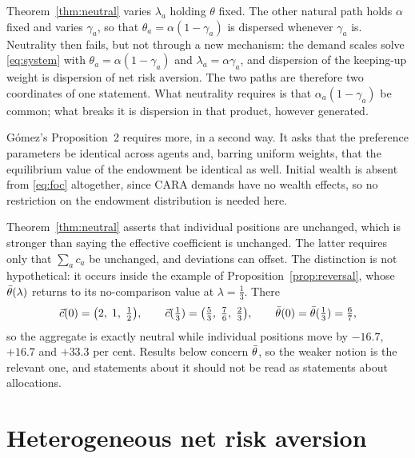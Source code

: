 \begin{remark}
\label{rem:param}
Theorem~\ref{thm:neutral} varies $\lambda_a$ holding $\theta$ fixed. The other
natural path holds $\alpha$ fixed and varies $\gamma_a$, so that
$\theta_a=\alpha(1-\gamma_a)$ is dispersed whenever $\gamma_a$ is. Neutrality
then fails, but not through a new mechanism: the demand scales solve
\eqref{eq:system} with $\theta_a=\alpha(1-\gamma_a)$ and
$\lambda_a=\alpha\gamma_a$, and dispersion of the keeping-up weight is
dispersion of net risk aversion. The two paths are therefore two coordinates of
one statement. What neutrality requires is that $\alpha_a(1-\gamma_a)$ be
common; what breaks it is dispersion in that product, however generated.

Gómez's Proposition~2 requires more, in a second way. It asks that the
preference parameters be identical across agents and, barring uniform weights,
that the equilibrium value of the endowment be identical as well. Initial
wealth is absent from \eqref{eq:foc} altogether, since CARA demands have no
wealth effects, so no restriction on the endowment distribution is needed here.
\end{remark}

\begin{remark}
\label{rem:two}
Theorem~\ref{thm:neutral} asserts that individual positions are unchanged,
which is stronger than saying the effective coefficient is unchanged. The latter
requires only that $\sum_ac_a$ be unchanged, and deviations can offset. The
distinction is not hypothetical: it occurs inside the example of
Proposition~\ref{prop:reversal}, whose $\bar\theta(\lambda)$ returns to its
no-comparison value at $\lambda=\tfrac13$. There
%
\begin{equation*}
\vec c(0)=\big(2,\;1,\;\tfrac12\big),
\qquad
\vec c(\tfrac13)=\big(\tfrac53,\;\tfrac76,\;\tfrac23\big),
\qquad
\bar\theta(0)=\bar\theta(\tfrac13)=\tfrac67 ,
\end{equation*}
%
so the aggregate is exactly neutral while individual positions move by
$-16.7$, $+16.7$ and $+33.3$ per cent. Results below concern $\bar\theta$, so the
weaker notion is the relevant one, and statements about it should not be read
as statements about allocations.
\end{remark}

\section{Heterogeneous net risk aversion}
\label{sec:hetero}

